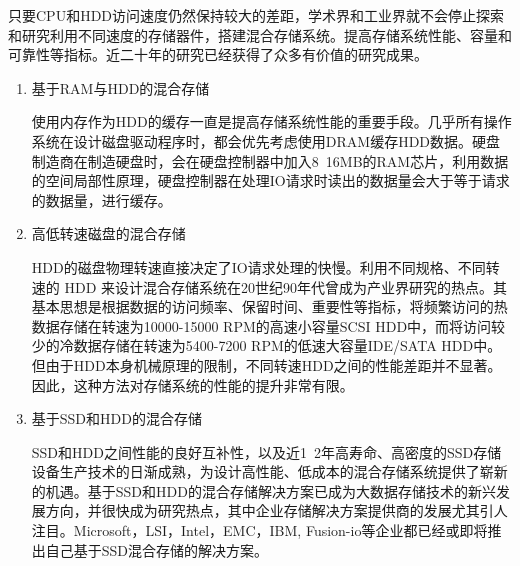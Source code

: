 只要CPU和HDD访问速度仍然保持较大的差距，学术界和工业界就不会停止探索和研究利用不同速度的存储器件，搭建混合存储系统。提高存储系统性能、容量和可靠性等指标。近二十年的研究已经获得了众多有价值的研究成果。

\begin{enumerate}

\item 基于RAM与HDD的混合存储

使用内存作为HDD的缓存一直是提高存储系统性能的重要手段。几乎所有操作系统在设计磁盘驱动程序时，都会优先考虑使用DRAM缓存HDD数据。硬盘制造商在制造硬盘时，会在硬盘控制器中加入8~16MB的RAM芯片，利用数据的空间局部性原理，硬盘控制器在处理IO请求时读出的数据量会大于等于请求的数据量，进行缓存。

\item 高低转速磁盘的混合存储

HDD的磁盘物理转速直接决定了IO请求处理的快慢。利用不同规格、不同转速的 HDD 来设计混合存储系统在20世纪90年代曾成为产业界研究的热点。其基本思想是根据数据的访问频率、保留时间、重要性等指标，将频繁访问的热数据存储在转速为10000-15000 RPM的高速小容量SCSI HDD中，而将访问较少的冷数据存储在转速为5400-7200 RPM的低速大容量IDE/SATA HDD中。但由于HDD本身机械原理的限制，不同转速HDD之间的性能差距并不显著。因此，这种方法对存储系统的性能的提升非常有限。

\item 基于SSD和HDD的混合存储

SSD和HDD之间性能的良好互补性，以及近1~2年高寿命、高密度的SSD存储设备生产技术的日渐成熟，为设计高性能、低成本的混合存储系统提供了崭新的机遇。基于SSD和HDD的混合存储解决方案已成为大数据存储技术的新兴发展方向，并很快成为研究热点，其中企业存储解决方案提供商的发展尤其引人注目。Microsoft，LSI，Intel，EMC，IBM, Fusion-io等企业都已经或即将推出自己基于SSD混合存储的解决方案。

\end{enumerate}

